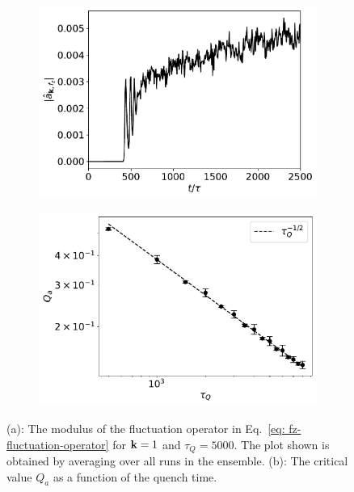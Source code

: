 \begin{figure}[tb]
    \centering
    \begin{subfigure}{0.45\textwidth}
        \includegraphics[width=\textwidth]
        {gfx/ch-spin1/1d_BA-FM_5000_fluctuation_diff.pdf}
        \caption{\label{fig: fluctuation-diff}}
    \end{subfigure}
    \begin{subfigure}{0.45\textwidth}
        \includegraphics[width=\textwidth]{gfx/ch-spin1/BA-FM_Qa_scaling.pdf}
        \caption{\label{fig: Q_a-scaling}}
    \end{subfigure}
    \caption[Growth of the fluctuation operator]
    {(a): The modulus of the fluctuation operator in
        Eq.~\eqref{eq: fz-fluctuation-operator} for \(\vb{k}=1\) and
        \(\tau_Q=5000\).
        The plot shown is obtained by averaging over all runs in the ensemble.
        (b): The critical value \(Q_a\) as a function of the quench time.
    }
\end{figure}
